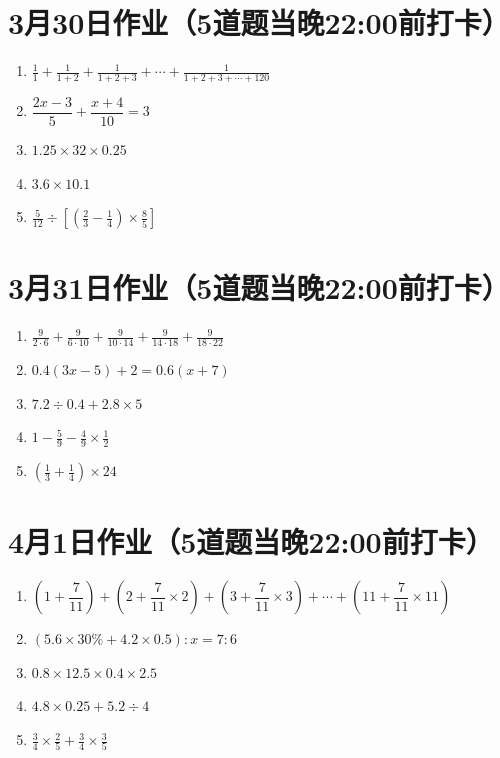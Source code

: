 \documentclass[UTF8,12pt,a4paper]{ctexart}
\newcommand{\BottomWriteSpace}{1.8cm}
\newenvironment{OnePageFiveFill}{
  \small
  \vspace*{0pt}
  \begin{enumerate}[leftmargin=*, itemsep=0pt, topsep=0pt, parsep=0pt, partopsep=0pt]
  \setlength{\parskip}{0pt}
}{
  \end{enumerate}
  \vspace*{\BottomWriteSpace}
  \normalsize
  \newpage
}
\newcommand{\Q}[1]{\item #1\par\vfill}
\newcommand{\Qlast}[1]{\item #1\par}
\newcommand{\BlankSpace}{\vspace{2.6cm}}
\begin{document}
\section*{3月30日作业（5道题当晚22:00前打卡）}
\begin{OnePageFiveFill}

\Q{$\displaystyle
\frac{1}{1}+\frac{1}{1+2}+\frac{1}{1+2+3}+\cdots+\frac{1}{1+2+3+\cdots+120}$}

\Q{$\dfrac{2x-3}{5}+\dfrac{x+4}{10}=3$}

\Q{$1.25 \times 32 \times 0.25$}

\Q{$3.6 \times 10.1$}

\Qlast{$\displaystyle \frac{5}{12} \div \left[ \left( \frac{2}{3} - \frac{1}{4} \right) \times \frac{8}{5} \right]$}

\end{OnePageFiveFill}

\section*{3月31日作业（5道题当晚22:00前打卡）}
\begin{OnePageFiveFill}

\Q{$\displaystyle \frac{9}{2\cdot6}+\frac{9}{6\cdot10}+\frac{9}{10\cdot14}+\frac{9}{14\cdot18}+\frac{9}{18\cdot22}$}

\Q{$0.4(3x-5)+2=0.6(x+7)$}

\Q{$7.2 \div 0.4 + 2.8 \times 5$}

\Q{$\displaystyle 1 - \frac{5}{9} - \frac{4}{9} \times \frac{1}{2}$}

\Qlast{$\displaystyle \left( \frac{1}{3} + \frac{1}{4} \right) \times 24$}

\end{OnePageFiveFill}

\section*{4月1日作业（5道题当晚22:00前打卡）}
\begin{OnePageFiveFill}

\Q{$\left(1+\dfrac{7}{11}\right)+\left(2+\dfrac{7}{11}\times2\right)+\left(3+\dfrac{7}{11}\times3\right)+\cdots+\left(11+\dfrac{7}{11}\times11\right)$ \BlankSpace}

\Q{$\left(5.6\times 30\%+4.2\times0.5\right):x=7:6$}

\Q{$0.8 \times 12.5 \times 0.4 \times 2.5$}

\Q{$4.8 \times 0.25 + 5.2 \div 4$}

\Qlast{$\displaystyle \frac{3}{4} \times \frac{2}{5} + \frac{3}{4} \times \frac{3}{5}$}

\end{OnePageFiveFill}
\end{document}
